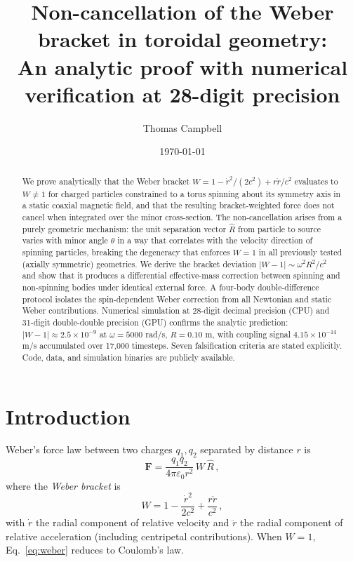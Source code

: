 \documentclass[12pt,preprint,amsmath,amssymb]{revtex4-2}
\begin{document}
\title{Non-cancellation of the Weber bracket in toroidal geometry:\\
An analytic proof with numerical verification at 28-digit precision}

\author{Thomas Campbell}

\date{\today}

\begin{abstract}
We prove analytically that the Weber bracket $W = 1 - \dot{r}^2/(2c^2) + r\ddot{r}/c^2$
evaluates to $W \neq 1$ for charged particles constrained to a torus spinning about its
symmetry axis in a static coaxial magnetic field, and that the resulting bracket-weighted
force does not cancel when integrated over the minor cross-section.
The non-cancellation arises from a purely geometric mechanism: the unit separation vector
$\hat{R}$ from particle to source varies with minor angle $\theta$ in a way that
correlates with the velocity direction of spinning particles, breaking the degeneracy
that enforces $W = 1$ in all previously tested (axially symmetric) geometries.
We derive the bracket deviation $|W - 1| \sim \omega^2 R^2 / c^2$ and show that it
produces a differential effective-mass correction between spinning and non-spinning
bodies under identical external force.
A four-body double-difference protocol isolates the spin-dependent Weber correction
from all Newtonian and static Weber contributions.
Numerical simulation at 28-digit decimal precision (CPU) and 31-digit double-double
precision (GPU) confirms the analytic prediction: $|W - 1| \approx 2.5 \times 10^{-9}$
at $\omega = 5000$ rad/s, $R = 0.10$ m, with coupling signal
$4.15 \times 10^{-14}$ m/s accumulated over 17{,}000 timesteps.
Seven falsification criteria are stated explicitly.
Code, data, and simulation binaries are publicly available.
\end{abstract}

\maketitle

\section{Introduction}
\label{sec:intro}

Weber's force law \cite{weber1846,assis2014} between two charges $q_1, q_2$
separated by distance $r$ is
\begin{equation}
\label{eq:weber}
\mathbf{F} = \frac{q_1 q_2}{4\pi\varepsilon_0 r^2}\,W\,\hat{R}\,,
\end{equation}
where the \emph{Weber bracket} is
\begin{equation}
\label{eq:bracket}
W = 1 - \frac{\dot{r}^2}{2c^2} + \frac{r\ddot{r}}{c^2}\,,
\end{equation}
with $\dot{r}$ the radial component of relative velocity and $\ddot{r}$ the radial
component of relative acceleration (including centripetal contributions).
When $W = 1$, Eq.~\eqref{eq:weber} reduces to Coulomb's law.
\end{document}
